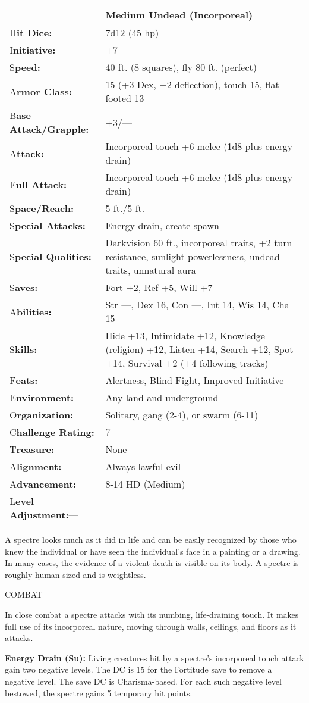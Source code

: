 \documentclass{article}
\begin{document}
\begin{tabular}{|>{\raggedright}p{91pt}|>{\raggedright}p{227pt}|}
\hline
  & Medium Undead (Incorporeal)\tabularnewline
\hline
H\textbf{it Dice:} & 7d12 (45 hp)\tabularnewline
\hline
I\textbf{nitiative:} & +7\tabularnewline
\hline
S\textbf{peed:} & 40 ft. (8 squares), fly 80 ft. (perfect)\tabularnewline
\hline
A\textbf{rmor Class:} & 15 (+3 Dex, +2 deflection), touch 15, flat-footed 13\tabularnewline
\hline
B\textbf{ase Attack/Grapple:} & +3/---\tabularnewline
\hline
A\textbf{ttack:} & Incorporeal touch +6 melee (1d8 plus energy drain)\tabularnewline
\hline
F\textbf{ull Attack:} & Incorporeal touch +6 melee (1d8 plus energy drain)\tabularnewline
\hline
S\textbf{pace/Reach:} & 5 ft./5 ft.\tabularnewline
\hline
S\textbf{pecial Attacks:} & Energy drain, create spawn\tabularnewline
\hline
S\textbf{pecial Qualities:} & Darkvision 60 ft., incorporeal traits, +2 turn resistance, 
sunlight powerlessness, undead traits, unnatural aura\tabularnewline
\hline
S\textbf{aves:} & Fort +2, Ref +5, Will +7\tabularnewline
\hline
A\textbf{bilities:} & Str ---, Dex 16, Con ---, Int 14, Wis 14, Cha 15\tabularnewline
\hline
S\textbf{kills:} & Hide +13, Intimidate +12, Knowledge (religion) +12, Listen +14, 
Search +12, Spot +14, Survival +2 (+4 following tracks)\tabularnewline
\hline
F\textbf{eats:} & Alertness, Blind-Fight, Improved Initiative\tabularnewline
\hline
E\textbf{nvironment:} & Any land and underground\tabularnewline
\hline
O\textbf{rganization:} & Solitary, gang (2-4), or swarm (6-11)\tabularnewline
\hline
C\textbf{hallenge Rating:} & 7\tabularnewline
\hline
T\textbf{reasure:} & None\tabularnewline
\hline
A\textbf{lignment:} & Always lawful evil\tabularnewline
\hline
A\textbf{dvancement:} & 8-14 HD (Medium)\tabularnewline
\hline
L\textbf{evel Adjustment:}--- & \tabularnewline
\hline
\end{tabular}

A spectre looks much as it did in life and can be easily recognized by those who 
knew the individual or have seen the individual's face in a painting or a drawing. 
In many cases, the evidence of a violent death is visible on its body. A spectre 
is roughly human-sized and is weightless.

COMBAT

In close combat a spectre attacks with its numbing, life-draining touch. It makes 
full use of its incorporeal nature, moving through walls, ceilings, and floors 
as it attacks.

\textbf{Energy Drain (Su):} Living creatures hit by a spectre's incorporeal touch 
attack gain two negative levels. The DC is 15 for the Fortitude save to remove 
a negative level. The save DC is Charisma-based. For each such negative level bestowed, 
the spectre gains 5 temporary hit points.
\end{document}

